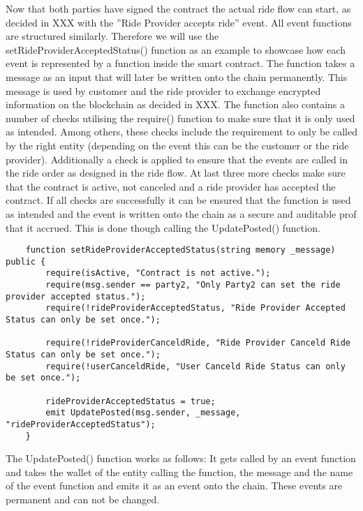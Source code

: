Now that both parties have signed the contract the actual ride flow can start, as decided in XXX with the ''Ride Provider accepts ride'' event. All event functions are structured similarly. Therefore we will use the setRideProviderAcceptedStatus() function as an example to showcase how each event is represented by a function inside the smart contract. The function takes a message as an input that will later be written onto the chain permanently. This message is used by customer and the ride provider to exchange encrypted information on the blockchain as decided in XXX. The function also contains a number of checks utilising the require() function to make sure that it is only used as intended. Among others, these checks include the requirement to only be called by the right entity (depending on the event this can be the customer or the ride provider). Additionally a check is applied to ensure that the events are called in the ride order as designed in the ride flow. At last three more checks make sure that the contract is active, not canceled and a ride provider has accepted the contract. If all checks are successfully it can be ensured that the function is used as intended and the event is written onto the chain as a secure and auditable prof that it accrued. This is done though calling the UpdatePosted() function.

\lstset{
  basicstyle=\footnotesize\ttfamily,
  breaklines=true,
  numbers=left,
  firstnumber=97
}
\begin{lstlisting}
    function setRideProviderAcceptedStatus(string memory _message) public {
        require(isActive, "Contract is not active.");
        require(msg.sender == party2, "Only Party2 can set the ride provider accepted status.");
        require(!rideProviderAcceptedStatus, "Ride Provider Accepted Status can only be set once.");

        require(!rideProviderCanceldRide, "Ride Provider Canceld Ride Status can only be set once.");
        require(!userCanceldRide, "User Canceld Ride Status can only be set once.");

        rideProviderAcceptedStatus = true;
        emit UpdatePosted(msg.sender, _message, "rideProviderAcceptedStatus");
    }
\end{lstlisting}

The UpdatePosted() function works as follows: It gets called by an event function and takes the wallet of the entity calling the function, the message and the name of the event function and emits it as an event onto the chain. These events are permanent and can not be changed.

